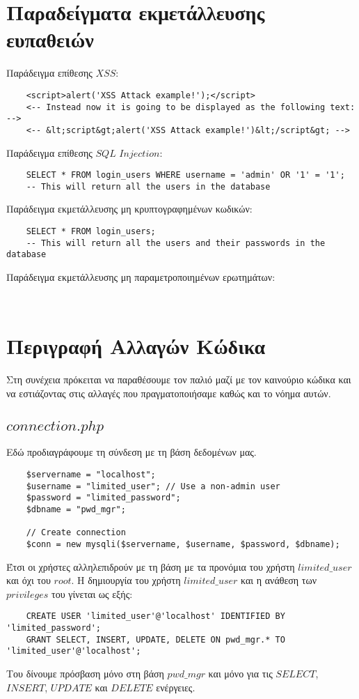 \documentclass{report}
\begin{document}
\section*{Παραδείγματα εκμετάλλευσης ευπαθειών}
Παράδειγμα επίθεσης $XSS$:
\begin{verbatim}
    <script>alert('XSS Attack example!');</script>
    <-- Instead now it is going to be displayed as the following text: -->
    <-- &lt;script&gt;alert('XSS Attack example!')&lt;/script&gt; -->
\end{verbatim}
Παράδειγμα επίθεσης $SQL$ $Injection$:
\begin{verbatim}
    SELECT * FROM login_users WHERE username = 'admin' OR '1' = '1';
    -- This will return all the users in the database
\end{verbatim}
Παράδειγμα εκμετάλλευσης μη κρυπτογραφημένων κωδικών:
\begin{verbatim}
    SELECT * FROM login_users;
    -- This will return all the users and their passwords in the database
\end{verbatim}
Παράδειγμα εκμετάλλευσης μη παραμετροποιημένων ερωτημάτων:
\begin{verbatim}
    
\end{verbatim}

\section*{Περιγραφή Αλλαγών Κώδικα}
Στη συνέχεια πρόκειται να παραθέσουμε τον παλιό μαζί με τον καινούριο κώδικα και να εστιάζοντας στις 
αλλαγές που πραγματοποιήσαμε καθώς και το νόημα αυτών.
\subsection*{$connection.php$}
Εδώ προδιαγράφουμε τη σύνδεση με τη βάση δεδομένων μας. 
\begin{verbatim}
    $servername = "localhost";
    $username = "limited_user"; // Use a non-admin user
    $password = "limited_password";
    $dbname = "pwd_mgr";

    // Create connection
    $conn = new mysqli($servername, $username, $password, $dbname);
\end{verbatim}
Έτσι οι χρήστες αλληλεπιδρούν με τη βάση με τα προνόμια του χρήστη $limited\_user$ και όχι του $root$. 
Η δημιουργία του χρήστη $limited\_user$ και η ανάθεση των $privileges$ του γίνεται ως εξής:
\begin{verbatim}
    CREATE USER 'limited_user'@'localhost' IDENTIFIED BY 'limited_password';
    GRANT SELECT, INSERT, UPDATE, DELETE ON pwd_mgr.* TO 'limited_user'@'localhost';
\end{verbatim}
Του δίνουμε πρόσβαση μόνο στη βάση $pwd\_mgr$ και μόνο για τις $SELECT$, $INSERT$, $UPDATE$ και 
$DELETE$ ενέργειες.
\end{document}
